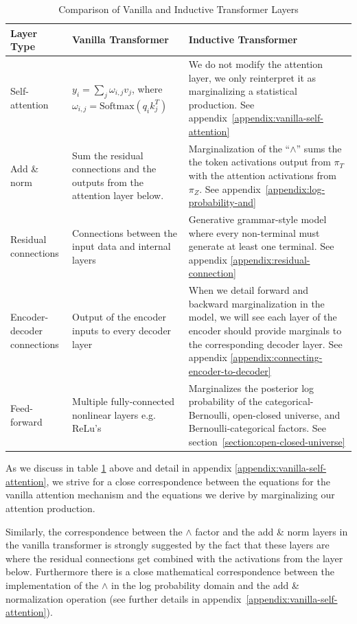 \documentclass{article}
\begin{document}
\setlength{\extrarowheight}{5pt}
\begin{table}[H]
    \centering
    \begin{tabular}{p{}>{\raggedright\arraybackslash}p{}p{}}
      \textbf{Layer Type} & \textbf{Vanilla Transformer}   &   \textbf{Inductive Transformer}   \\
      \hline
      Self-attention & $y_i = \sum_j \omega_{i,j} v_j$, where \qquad $\omega_{i,j} = \textrm{Softmax}(q_i k_j^T)$ & We do not modify the attention layer, we only reinterpret it as marginalizing a statistical production. See appendix~\ref{appendix:vanilla-self-attention} \\
      \hline
      Add \& norm & Sum the residual connections and the outputs from the attention layer below.  &  Marginalization of the ``$\land$'' sums the the token activations output from $\pi_T$ with the attention activations from $\pi_Z$. See appendix~\ref{appendix:log-probability-and}\\
      \hline
      Residual connections & Connections between the input data and internal layers & Generative grammar-style model where every non-terminal must generate at least one terminal. See appendix \ref{appendix:residual-connection} \\
      \hline
      Encoder-decoder connections & Output of the encoder inputs to every decoder layer & When we detail forward and backward marginalization in the model, we will see each layer of the encoder should provide marginals to the corresponding decoder layer. See appendix \ref{appendix:connecting-encoder-to-decoder}\\
      \hline
      Feed-forward & Multiple fully-connected nonlinear layers e.g. ReLu's & Marginalizes the posterior log probability of the categorical-Bernoulli, open-closed universe, and Bernoulli-categorical factors. See section~\ref{section:open-closed-universe} \\
      \hline
    \end{tabular}
    \caption{Comparison of Vanilla and Inductive Transformer Layers}
    \label{tab:rosetta}
\end{table}

As we discuss in table \ref{tab:rosetta} above and detail in appendix \ref{appendix:vanilla-self-attention}, we strive for a close correspondence between the equations for the vanilla attention mechanism and the equations we derive by marginalizing our attention production.

Similarly, the correspondence between the $\land$ factor and the add \& norm layers in the vanilla transformer is strongly suggested by the fact that these layers are where the residual connections get combined with the activations from the layer below.  Furthermore there is a close mathematical correspondence between the implementation of the $\land$ in the log probability domain and the add \& normalization operation (see further details in appendix~\ref{appendix:vanilla-self-attention}).
\end{document}
